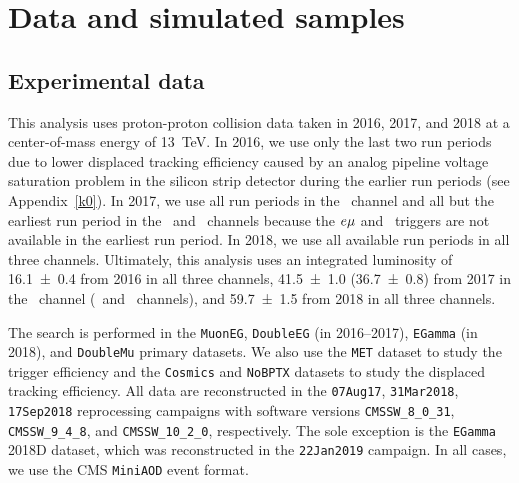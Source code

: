 \section{Data and simulated samples}
\label{samples}
\subsection{Experimental data}
This analysis uses proton-proton collision data taken in 2016, 2017, and 2018 at a center-of-mass energy of \SI{13}{\TeV}. In 2016, we use only the last two run periods due to lower displaced tracking efficiency caused by an analog pipeline voltage saturation problem in the silicon strip detector during the earlier run periods (see Appendix~\ref{k0}). In 2017, we use all run periods in the \Pe\Pe\ channel and all but the earliest run period in the \Pe\Pgm\ and \Pgm\Pgm\ channels because the $e{\mu}$ and \Pgm\Pgm\ triggers are not available in the earliest run period. In 2018, we use all available run periods in all three channels. Ultimately, this analysis uses an integrated luminosity of \SI{16.1\pm0.4}{\fb} from 2016 in all three channels, \SI{41.5\pm1.0}{\fb} (\SI{36.7\pm0.8}{\fb}) from 2017 in the \Pe\Pe\ channel (\Pe\Pgm\ and \Pgm\Pgm\ channels), and \SI{59.7\pm1.5}{\fb} from 2018 in all three channels.

The search is performed in the \texttt{MuonEG}, \texttt{DoubleEG} (in 2016--2017), \texttt{EGamma} (in 2018), and \texttt{DoubleMu} primary datasets. We also use the \texttt{MET} dataset to study the trigger efficiency and the \texttt{Cosmics} and \texttt{NoBPTX} datasets to study the displaced tracking efficiency. All data are reconstructed in the \texttt{07Aug17}, \texttt{31Mar2018}, \texttt{17Sep2018} reprocessing campaigns with software versions \texttt{CMSSW\_8\_0\_31}, \texttt{CMSSW\_9\_4\_8}, and \texttt{CMSSW\_10\_2\_0}, respectively. The sole exception is the \texttt{EGamma} 2018D dataset, which was reconstructed in the \texttt{22Jan2019} campaign. In all cases, we use the CMS \texttt{MiniAOD} event format.

